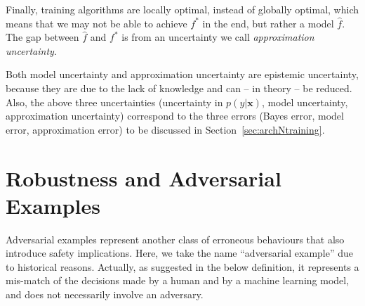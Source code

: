 Finally, training algorithms are locally optimal, instead of globally optimal, which means that we may not be able to achieve $f^*$ in the end, but rather a model $\hat{f}$. The gap between $\hat{f}$ and $f^*$ is from an uncertainty we call \emph{approximation uncertainty}. 

Both model uncertainty and approximation uncertainty are epistemic uncertainty, because they are  due to the lack of knowledge and can -- in theory -- be reduced. Also, the above three uncertainties (uncertainty in $p(y|\textbf{x})$, model uncertainty, approximation uncertainty) correspond to the three errors (Bayes error, model error, approximation error) to be discussed in Section~\ref{sec:archNtraining}. 

\section{Robustness and Adversarial Examples}\label{sec:adversarialexample}



Adversarial examples \cite{szegedy2014intriguing} represent another class of erroneous behaviours that also introduce safety implications. Here, we take the name ``adversarial example'' due to historical reasons. Actually, as suggested in the below definition, it represents a mis-match of the decisions made by a human and by a machine learning model, and does not necessarily involve an adversary.  

